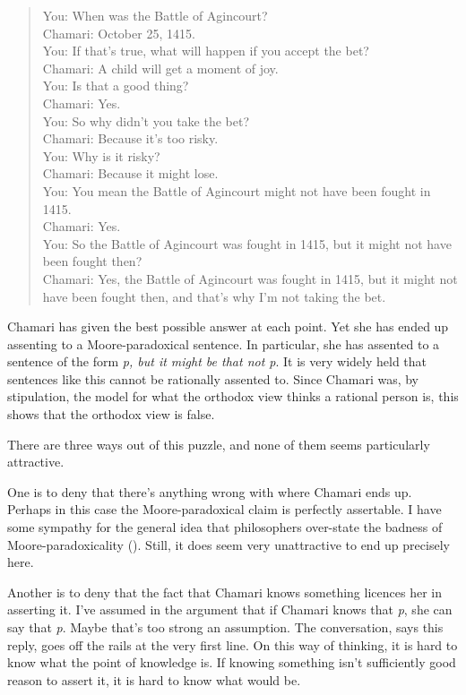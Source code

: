 \documentclass[
  10pt,
  letterpaper,
  twoside]{scrbook}
\begin{document}
\begin{quote}
You: When was the Battle of Agincourt?\\
Chamari: October 25, 1415.\\
You: If that's true, what will happen if you accept the bet?\\
Chamari: A child will get a moment of joy.\\
You: Is that a good thing?\\
Chamari: Yes.\\
You: So why didn't you take the bet?\\
Chamari: Because it's too risky.\\
You: Why is it risky?\\
Chamari: Because it might lose.\\
You: You mean the Battle of Agincourt might not have been fought in
1415.\\
Chamari: Yes.\\
You: So the Battle of Agincourt was fought in 1415, but it might not
have been fought then?\\
Chamari: Yes, the Battle of Agincourt was fought in 1415, but it might
not have been fought then, and that's why I'm not taking the bet.
\end{quote}

Chamari has given the best possible answer at each point. Yet she has
ended up assenting to a Moore-paradoxical sentence. In particular, she
has assented to a sentence of the form \emph{p, but it might be that not
p}. It is very widely held that sentences like this cannot be rationally
assented to. Since Chamari was, by stipulation, the model for what the
orthodox view thinks a rational person is, this shows that the orthodox
view is false.

There are three ways out of this puzzle, and none of them seems
particularly attractive.

One is to deny that there's anything wrong with where Chamari ends up.
Perhaps in this case the Moore-paradoxical claim is perfectly
assertable. I have some sympathy for the general idea that philosophers
over-state the badness of Moore-paradoxicality
().
Still, it does seem very unattractive to end up precisely here.

Another is to deny that the fact that Chamari knows something licences
her in asserting it. I've assumed in the argument that if Chamari knows
that \emph{p}, she can say that \emph{p}. Maybe that's too strong an
assumption. The conversation, says this reply, goes off the rails at the
very first line. On this way of thinking, it is hard to know what the
point of knowledge is. If knowing something isn't sufficiently good
reason to assert it, it is hard to know what would be.
\end{document}
